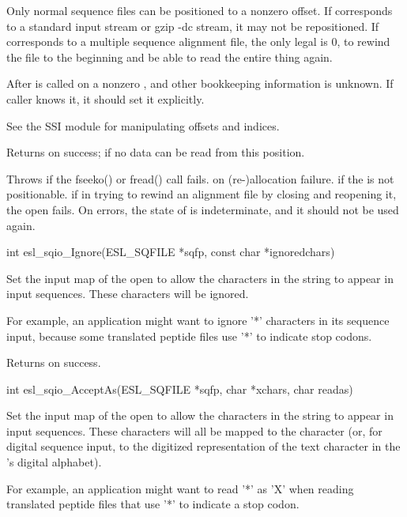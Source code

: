 \begin{sreapi}
Only normal sequence files can be positioned to a
nonzero offset. If  corresponds to a standard
input stream or gzip -dc stream, it may not be
repositioned. If  corresponds to a multiple
sequence alignment file, the only legal 
is 0, to rewind the file to the beginning and 
be able to read the entire thing again.

After  is called on a nonzero
, and other bookkeeping information is unknown.
If caller knows it, it should set it explicitly.

See the SSI module for manipulating offsets and indices.

Returns      on success;
    if no data can be read from this position.

Throws  if the fseeko() or fread() call fails.
 on (re-)allocation failure.
 if the  is not positionable.
 if in trying to rewind an alignment file  
by closing and reopening it, the open fails.
On errors, the state of  is indeterminate, and
it should not be used again.


\hypertarget{func:esl_sqio_Ignore()}
{\item[int esl\_sqio\_Ignore(ESL\_SQFILE *sqfp, const char *ignoredchars)]}

Set the input map of the open  to allow
the characters in the string  to appear
in input sequences. These characters will be ignored.

For example, an application might want to ignore '*'
characters in its sequence input, because some translated
peptide files use '*' to indicate stop codons.

Returns  on success.


\hypertarget{func:esl_sqio_AcceptAs()}
{\item[int esl\_sqio\_AcceptAs(ESL\_SQFILE *sqfp, char *xchars, char readas)]}

Set the input map of the open  to allow the 
characters in the string  to appear in 
input sequences. These characters will all be 
mapped to the character  (or, for digital
sequence input, to the digitized representation 
of the text character  in the 's
digital alphabet).

For example, an application might want to read
'*' as 'X' when reading translated peptide files
that use '*' to indicate a stop codon.


\end{sreapi}
